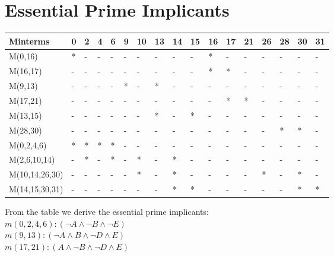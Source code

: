 \documentclass{article}
\begin{document}
	\section{\textbf{Essential Prime Implicants}}
	\begin{center}
		\begin{tabular}{ | l | m{0.5cm} | m{0.5cm} | m{0.5cm} | m{0.5cm} | m{0.5cm} | m{0.5cm} | m{0.5cm} | m{0.5cm} | m{0.5cm} | m{0.5cm} | m{0.5cm} | m{0.5cm} | m{0.5cm} | m{0.5cm} | m{0.5cm} | m{0.5cm} |  }
			\hline
			Minterms & 0 & 2 & 4 & 6 & 9 & 10 & 13 & 14 & 15 & 16 & 17 & 21 & 26 & 28 & 30 & 31 \\
			\hline
			M(0,16) & * & - & - & - & - & - & - & - & - & * & - & - & - & - & - & - \\
			\hline
			M(16,17) & - & - & - & - & - & - & - & - & - & * & * & - & - & - & - & - \\
			\hline
			M(9,13) & - & - & - & - & * & - & * & - & - & - & - & - & - & - & - & - \\
			\hline
			M(17,21) & - & - & - & - & - & - & - & - & - & - & * & * & - & - & - & - \\
			\hline
			M(13,15) & - & - & - & - & - & - & * & - & * & - & - & - & - & - & - & - \\
			\hline
			M(28,30) & - & - & - & - & - & - & - & - & - & - & - & - & - & * & * & - \\
			\hline
			M(0,2,4,6) & * & * & * & * & - & - & - & - & - & - & - & - & - & - & - & - \\
			\hline
			M(2,6,10,14) & - & * & - & * & - & * & - & * & - & - & - & - & - & - & - & - \\
			\hline
			M(10,14,26,30) & - & - & - & - & - & * & - & * & - & - & - & - & * & - & * & - \\
			\hline
			M(14,15,30,31) & - & - & - & - & - & - & - & * & * & - & - & - & - & - & * & * \\
			\hline
		\end{tabular}
    \end{center}

    From the table we derive the essential prime implicants:\\

    $m(0, 2, 4, 6) : (\neg A \land \neg B \land \neg E)$\\

    $m(9, 13) : (\neg A \land B \land \neg D \land E)$\\

    $m(17, 21) : (A \land \neg B \land \neg D \land E)$\\
    
\end{document}
